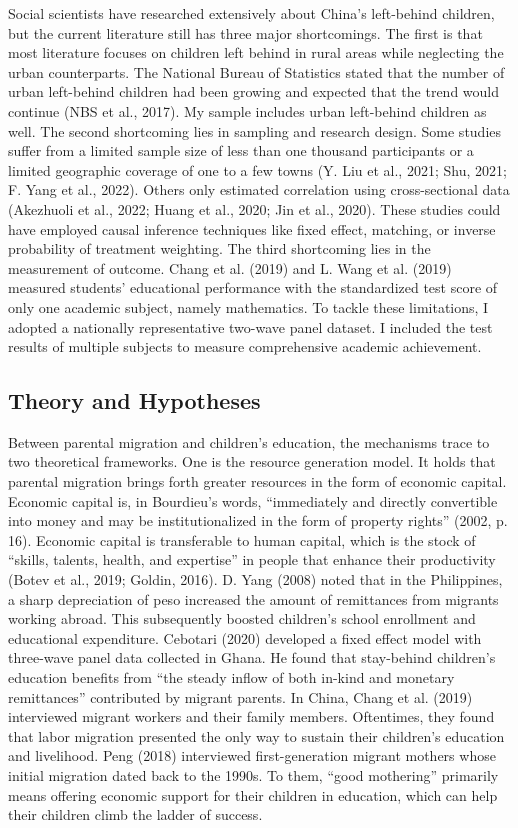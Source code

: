 \documentclass[
  man,floatsintext]{apa7}
\begin{document}
Social scientists have researched extensively about China's left-behind children, but the current literature still has three major shortcomings. The first is that most literature focuses on children left behind in rural areas while neglecting the urban counterparts. The National Bureau of Statistics stated that the number of urban left-behind children had been growing and expected that the trend would continue (NBS et al., 2017). My sample includes urban left-behind children as well. The second shortcoming lies in sampling and research design. Some studies suffer from a limited sample size of less than one thousand participants or a limited geographic coverage of one to a few towns (Y. Liu et al., 2021; Shu, 2021; F. Yang et al., 2022). Others only estimated correlation using cross-sectional data (Akezhuoli et al., 2022; Huang et al., 2020; Jin et al., 2020). These studies could have employed causal inference techniques like fixed effect, matching, or inverse probability of treatment weighting. The third shortcoming lies in the measurement of outcome. Chang et al. (2019) and L. Wang et al. (2019) measured students' educational performance with the standardized test score of only one academic subject, namely mathematics. To tackle these limitations, I adopted a nationally representative two-wave panel dataset. I included the test results of multiple subjects to measure comprehensive academic achievement.

\hypertarget{theory-and-hypotheses}{%
\subsection{Theory and Hypotheses}\label{theory-and-hypotheses}}

Between parental migration and children's education, the mechanisms trace to two theoretical frameworks. One is the resource generation model. It holds that parental migration brings forth greater resources in the form of economic capital. Economic capital is, in Bourdieu's words, ``immediately and directly convertible into money and may be institutionalized in the form of property rights'' (2002, p. 16). Economic capital is transferable to human capital, which is the stock of ``skills, talents, health, and expertise'' in people that enhance their productivity (Botev et al., 2019; Goldin, 2016). D. Yang (2008) noted that in the Philippines, a sharp depreciation of peso increased the amount of remittances from migrants working abroad. This subsequently boosted children's school enrollment and educational expenditure. Cebotari (2020) developed a fixed effect model with three-wave panel data collected in Ghana. He found that stay-behind children's education benefits from ``the steady inflow of both in-kind and monetary remittances'' contributed by migrant parents. In China, Chang et al. (2019) interviewed migrant workers and their family members. Oftentimes, they found that labor migration presented the only way to sustain their children's education and livelihood. Peng (2018) interviewed first-generation migrant mothers whose initial migration dated back to the 1990s. To them, ``good mothering'' primarily means offering economic support for their children in education, which can help their children climb the ladder of success.
\end{document}

